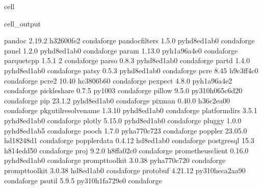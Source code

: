 \documentclass[letterpaper,table,10pt,english]{jupyterBook}
\begin{document}
\begin{sphinxuseclass}{cell}
\begin{sphinxVerbatimOutput}
\begin{sphinxuseclass}{cell_output}
\begin{sphinxVerbatim}[commandchars=\\\{\}]
pandoc                    2.19.2               h32600fe\PYGZus{}2    conda\PYGZhy{}forge
pandocfilters             1.5.0              pyhd8ed1ab\PYGZus{}0    conda\PYGZhy{}forge
panel                     1.2.0              pyhd8ed1ab\PYGZus{}0    conda\PYGZhy{}forge
param                     1.13.0             pyh1a96a4e\PYGZus{}0    conda\PYGZhy{}forge
parquet\PYGZhy{}cpp               1.5.1                         2    conda\PYGZhy{}forge
parso                     0.8.3              pyhd8ed1ab\PYGZus{}0    conda\PYGZhy{}forge
partd                     1.4.0              pyhd8ed1ab\PYGZus{}0    conda\PYGZhy{}forge
patsy                     0.5.3              pyhd8ed1ab\PYGZus{}0    conda\PYGZhy{}forge
pcre                      8.45                 h9c3ff4c\PYGZus{}0    conda\PYGZhy{}forge
pcre2                     10.40                hc3806b6\PYGZus{}0    conda\PYGZhy{}forge
pexpect                   4.8.0              pyh1a96a4e\PYGZus{}2    conda\PYGZhy{}forge
pickleshare               0.7.5                   py\PYGZus{}1003    conda\PYGZhy{}forge
pillow                    9.5.0           py310h065c6d2\PYGZus{}0    conda\PYGZhy{}forge
pip                       23.1.2             pyhd8ed1ab\PYGZus{}0    conda\PYGZhy{}forge
pixman                    0.40.0               h36c2ea0\PYGZus{}0    conda\PYGZhy{}forge
pkgutil\PYGZhy{}resolve\PYGZhy{}name      1.3.10             pyhd8ed1ab\PYGZus{}0    conda\PYGZhy{}forge
platformdirs              3.5.1              pyhd8ed1ab\PYGZus{}0    conda\PYGZhy{}forge
plotly                    5.15.0             pyhd8ed1ab\PYGZus{}0    conda\PYGZhy{}forge
pluggy                    1.0.0              pyhd8ed1ab\PYGZus{}5    conda\PYGZhy{}forge
pooch                     1.7.0              pyha770c72\PYGZus{}3    conda\PYGZhy{}forge
poppler                   23.05.0              hd18248d\PYGZus{}1    conda\PYGZhy{}forge
poppler\PYGZhy{}data              0.4.12               hd8ed1ab\PYGZus{}0    conda\PYGZhy{}forge
postgresql                15.3                 h814edd5\PYGZus{}0    conda\PYGZhy{}forge
proj                      9.2.0                h8ffa02c\PYGZus{}0    conda\PYGZhy{}forge
prometheus\PYGZus{}client         0.16.0             pyhd8ed1ab\PYGZus{}0    conda\PYGZhy{}forge
prompt\PYGZhy{}toolkit            3.0.38             pyha770c72\PYGZus{}0    conda\PYGZhy{}forge
prompt\PYGZus{}toolkit            3.0.38               hd8ed1ab\PYGZus{}0    conda\PYGZhy{}forge
protobuf                  4.21.12         py310heca2aa9\PYGZus{}0    conda\PYGZhy{}forge
psutil                    5.9.5           py310h1fa729e\PYGZus{}0    conda\PYGZhy{}forge

\end{sphinxVerbatim}
\end{sphinxuseclass}
\end{sphinxVerbatimOutput}
\end{sphinxuseclass}
\end{document}
